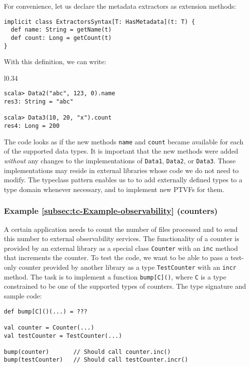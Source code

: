 For convenience, let us declare the metadata extractors as extension
methods:
\begin{lstlisting}
implicit class ExtractorsSyntax[T: HasMetadata](t: T) {
  def name: String = getName(t)
  def count: Long = getCount(t)
}
\end{lstlisting}
With this definition, we can write:

\begin{wrapfigure}{l}{0.34\columnwidth}%
\vspace{-0.85\baselineskip}
\begin{lstlisting}
scala> Data2("abc", 123, 0).name
res3: String = "abc"

scala> Data3(10, 20, "x").count
res4: Long = 200
\end{lstlisting}

\vspace{-0.95\baselineskip}
\end{wrapfigure}%

\noindent The code looks as if the new methods \lstinline!name! and
\lstinline!count! became available for each of the supported data
types. It is important that the new methods were added \emph{without}
any changes to the implementations of \lstinline!Data1!, \lstinline!Data2!,
or \lstinline!Data3!. Those implementations may reside in external
libraries whose code we do not need to modify. The typeclass pattern
enables us to to add externally defined types to a type domain whenever
necessary, and to implement new PTVFs for them.

\subsubsection{Example \label{subsec:tc-Example-observability}\ref{subsec:tc-Example-observability}
(counters)}

A certain application needs to count the number of files processed
and to send this number to external observability services. The functionality
of a counter is provided by an external library as a special class
\lstinline!Counter! with an \lstinline!inc! method that increments
the counter. To test the code, we want to be able to pass a test-only
counter provided by another library as a type \lstinline!TestCounter!
with an \lstinline!incr! method. The task is to implement a function
\lstinline!bump[C]()!, where \lstinline!C! is a type constrained
to be one of the supported types of counters. The type signature and
sample code:
\begin{lstlisting}
def bump[C]()(...) = ???

val counter = Counter(...)
val testCounter = TestCounter(...)

bump(counter)       // Should call counter.inc()
bump(testCounter)   // Should call testCounter.incr()
\end{lstlisting}


